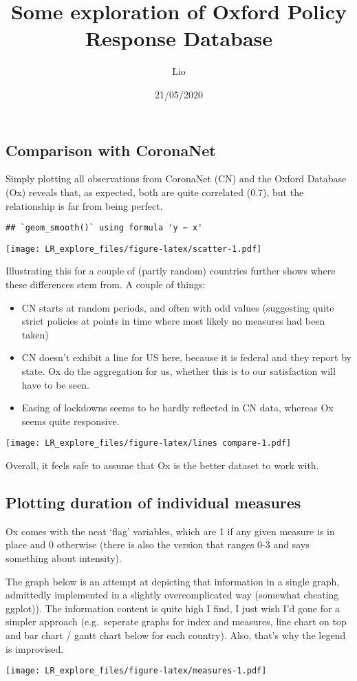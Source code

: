 \documentclass[
]{article}
\title{Some exploration of Oxford Policy Response Database}
\author{Lio}
\date{21/05/2020}
\providecommand{\tightlist}{%
  \setlength{\itemsep}{0pt}\setlength{\parskip}{0pt}}
\begin{document}
\maketitle

\hypertarget{comparison-with-coronanet}{%
\subsection{Comparison with CoronaNet}\label{comparison-with-coronanet}}

Simply plotting all observations from CoronaNet (CN) and the Oxford
Database (Ox) reveals that, as expected, both are quite correlated
(0.7), but the relationship is far from being perfect.

\begin{verbatim}
## `geom_smooth()` using formula 'y ~ x'
\end{verbatim}

\texttt{[image: LR\_explore\_files/figure-latex/scatter-1.pdf]}

Illustrating this for a couple of (partly random) countries further
shows where these differences stem from. A couple of things:

\begin{itemize}
\tightlist
\item
  CN starts at random periods, and often with odd values (suggesting
  quite strict policies at points in time where most likely no measures
  had been taken)
\item
  CN doesn't exhibit a line for US here, because it is federal and they
  report by state. Ox do the aggregation for us, whether this is to our
  satisfaction will have to be seen.
\item
  Easing of lockdowns seems to be hardly reflected in CN data, whereas
  Ox seems quite responsive.
\end{itemize}

\texttt{[image: LR\_explore\_files/figure-latex/lines compare-1.pdf]}

Overall, it feels safe to assume that Ox is the better dataset to work
with.

\hypertarget{plotting-duration-of-individual-measures}{%
\subsection{Plotting duration of individual
measures}\label{plotting-duration-of-individual-measures}}

Ox comes with the neat `flag' variables, which are 1 if any given
measure is in place and 0 otherwise (there is also the version that
ranges 0-3 and says something about intensity).

The graph below is an attempt at depicting that information in a single
graph, admittedly implemented in a slightly overcomplicated way
(somewhat cheating ggplot)). The information content is quite high I
find, I just wish I'd gone for a simpler approach (e.g.~seperate graphs
for index and measures, line chart on top and bar chart / gantt chart
below for each country). Also, that's why the legend is improvised.

\texttt{[image: LR\_explore\_files/figure-latex/measures-1.pdf]}
\end{document}
